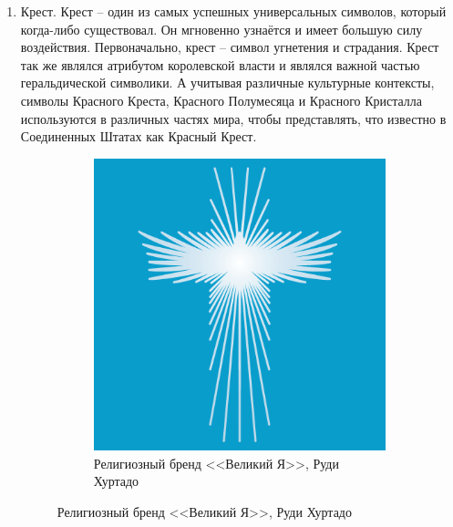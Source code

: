 \begin{enumerate}
\item Крест. Крест -- один из самых успешных универсальных символов, который
  когда-либо существовал. Он мгновенно узнаётся и  имеет большую силу
  воздействия. Первоначально, крест -- символ угнетения и страдания. Крест так
  же являлся атрибутом королевской власти и являлся важной частью
  геральдической символики. А учитывая различные культурные контексты,
  символы Красного Креста, Красного Полумесяца и Красного Кристалла
  используются в различных частях мира, чтобы представлять, что известно в
  Соединенных Штатах как Красный Крест.

\begin{figure}[h!]
  \centering
  \begin{subfigure}{.45\textwidth}
    \centering
    \includegraphics[width=\linewidth]{images/cross1}
    \caption{Религиозный бренд <<Великий Я>>, Руди Хуртадо}


\end{subfigure}
\end{figure}
\end{enumerate}
